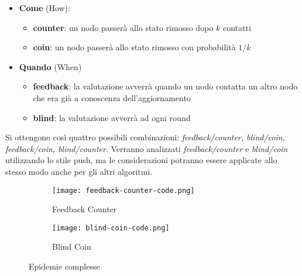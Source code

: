 \begin{itemize}
    \item \textbf{Come} (How):
    \begin{itemize}
        \item \textbf{counter}: un nodo passerà allo stato rimosso dopo $k$ contatti
        \item \textbf{coin}: un nodo passerà allo stato rimosso con probabilità $1/k$

    \end{itemize}
    \item \textbf{Quando} (When)
    \begin{itemize}
        \item \textbf{feedback}: la valutazione avverrà quando un nodo contatta un altro nodo che era già a conoscenza dell’aggiornamento
        \item \textbf{blind}: la valutazione avverrà ad ogni round
    \end{itemize}
\end{itemize}

Si ottengono così quattro possibili combinazioni: \textit{
feedback/counter, blind/coin, feedback/coin, blind/counter}.
Verranno analizzati \textit{feedback/counter} e \textit{blind/coin} utilizzando lo stile push, ma le considerazioni potranno essere applicate allo stesso modo anche per gli altri algoritmi.

\begin{figure}[!h]
    \begin{subfigure}{0.40\textwidth}
      \texttt{[image: feedback-counter-code.png]}
      \caption{Feedback Counter}\label{fig:feedback_counter_code}
    \end{subfigure}\hfill
    \begin{subfigure}{0.40\textwidth}
      \texttt{[image: blind-coin-code.png]}
      \caption{Blind Coin}\label{fig:blind_coin_code}
    \end{subfigure}\hfill
    \caption{Epidemie complesse}
    \label{fig:complex_epidemics}
\end{figure}


